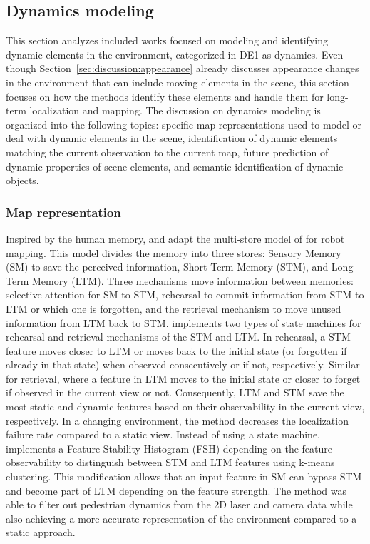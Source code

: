 \subsection{Dynamics modeling}
\label{sec:discussion:dynamics}

This section analyzes included works focused on modeling and identifying dynamic elements in the environment, categorized in DE1 as dynamics.
Even though Section~\ref{sec:discussion:appearance} already discusses appearance changes in the environment that can include moving elements in the scene, this section focuses on how the methods identify these elements and handle them for long-term localization and mapping.
The discussion on dynamics modeling is organized into the following topics: specific map representations used to model or deal with dynamic elements in the scene, identification of dynamic elements matching the current observation to the current map, future prediction of dynamic properties of scene elements, and semantic identification of dynamic objects.



\subsubsection{Map representation}
\label{sec:discussion:dynamics:map}

Inspired by the human memory, \cite{dayoub-et-al:2011:013} and \cite{bacca-et-al:2013:003} adapt the multi-store model of \cite{discussion:atkinson:stm+ltm} for robot mapping. This model divides the memory into three stores: Sensory Memory (SM) to save the perceived information, Short-Term Memory (STM), and Long-Term Memory (LTM).
Three mechanisms move information between memories: selective attention for SM to STM, rehearsal to commit information from STM to LTM or which one is forgotten, and the retrieval mechanism to move unused information from LTM back to STM.
\cite{dayoub-et-al:2011:013} implements two types of state machines for rehearsal and retrieval mechanisms of the STM and LTM. In rehearsal, a STM feature moves closer to LTM or moves back to the initial state (or forgotten if already in that state) when observed consecutively or if not, respectively. Similar for retrieval, where a feature in LTM moves to the initial state or closer to forget if observed in the current view or not.
Consequently, LTM and STM save the most static and dynamic features based on their observability in the current view, respectively.
In a changing environment, the method decreases the localization failure rate compared to a static view.
Instead of using a state machine, \cite{bacca-et-al:2013:003} implements a Feature Stability Histogram (FSH) depending on the feature observability to distinguish between STM and LTM features using k-means clustering. This modification allows that an input feature in SM can bypass STM and become part of LTM depending on the feature strength.
The method was able to filter out pedestrian dynamics from the 2D laser and camera data while also achieving a more accurate representation of the environment compared to a static approach.

